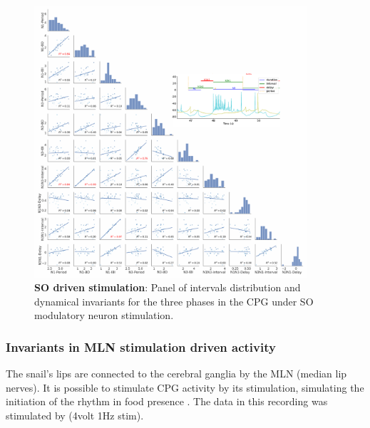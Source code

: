 \begin{figure}[htbp]
	\centering
	\includegraphics[width=0.9\textwidth]{./invariants/data/SUSSEX/SO_driven/images/panel_with_pairplot.pdf}
	\caption{\textbf{SO driven stimulation}: Panel of intervals distribution and dynamical invariants for the three phases in the CPG under SO modulatory neuron stimulation.}
	\label{fig:so stimulation pairplot}
\end{figure}



\subsubsection{Invariants in MLN stimulation driven activity}
The snail's lips are connected to the cerebral ganglia by the MLN (median lip nerves). It is possible to stimulate CPG activity by its stimulation, simulating the initiation of the rhythm in food presence \parencite{staras_electrophysiological_2019}. The data in this recording was stimulated by (4volt 1Hz stim).



